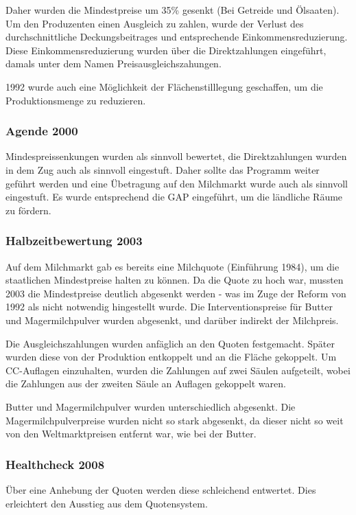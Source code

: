 \documentclass[11pt]{scrbook}
\begin{document}
Daher wurden die Mindestpreise um 35\% gesenkt (Bei Getreide und Ölsaaten).
Um den Produzenten einen Ausgleich zu zahlen, wurde der Verlust des durchschnittliche Deckungsbeitrages und entsprechende Einkommensreduzierung.
Diese Einkommensreduzierung wurden über die Direktzahlungen eingeführt, damals unter dem Namen Preisausgleichszahungen.

1992 wurde auch eine Möglichkeit der Flächenstilllegung geschaffen, um die Produktionsmenge zu reduzieren.

\subsubsection{Agende 2000}
Mindespreissenkungen wurden als sinnvoll bewertet, die Direktzahlungen wurden in dem Zug auch als sinnvoll eingestuft.
Daher sollte das Programm weiter geführt werden und eine Übetragung auf den Milchmarkt wurde auch als sinnvoll eingestuft.
Es wurde entsprechend die \ac{GAP} eingeführt, um die ländliche Räume zu fördern.

\subsubsection{Halbzeitbewertung 2003}
Auf dem Milchmarkt gab es bereits eine Milchquote (Einführung 1984), um die staatlichen Mindestpreise halten zu können.
Da die Quote zu hoch war, mussten 2003 die Mindestpreise deutlich abgesenkt werden - was im Zuge der Reform von 1992 als nicht notwendig hingestellt wurde.
Die Interventionspreise für Butter und Magermilchpulver wurden abgesenkt, und darüber indirekt der Milchpreis.

Die Ausgleichszahlungen wurden anfäglich an den Quoten festgemacht. Später wurden diese von der Produktion entkoppelt und an die Fläche gekoppelt.
Um \ac{CC}-Auflagen einzuhalten, wurden die Zahlungen auf zwei Säulen aufgeteilt, wobei die Zahlungen aus der zweiten Säule an Auflagen gekoppelt waren.

Butter und Magermilchpulver wurden unterschiedlich abgesenkt.
Die Magermilchpulverpreise wurden nicht so stark abgesenkt, da dieser nicht so weit von den Weltmarktpreisen entfernt war, wie bei der Butter.

\subsubsection{Healthcheck 2008}
Über eine Anhebung der Quoten werden diese schleichend entwertet.
Dies erleichtert den Ausstieg aus dem Quotensystem.
\end{document}
